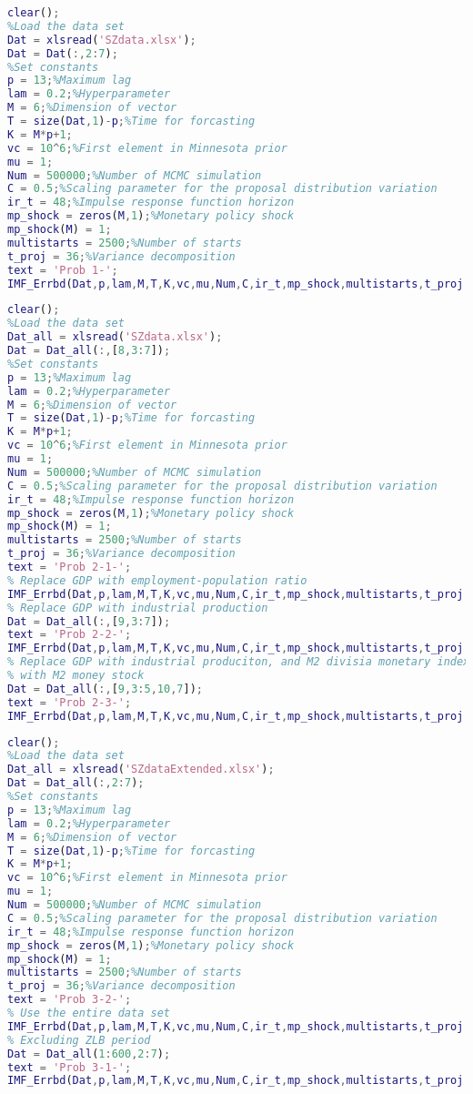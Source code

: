 \documentclass[11pt, oneside]{article}   	%
\begin{document}
\begin{appendices}
\begin{lstlisting}[language=Matlab ,caption={\textit{prob1.m} solves problem 1.}, label={code:prob1}]
clear();
%Load the data set
Dat = xlsread('SZdata.xlsx');
Dat = Dat(:,2:7);
%Set constants
p = 13;%Maximum lag
lam = 0.2;%Hyperparameter
M = 6;%Dimension of vector
T = size(Dat,1)-p;%Time for forcasting
K = M*p+1;
vc = 10^6;%First element in Minnesota prior
mu = 1;
Num = 500000;%Number of MCMC simulation
C = 0.5;%Scaling parameter for the proposal distribution variation
ir_t = 48;%Impulse response function horizon
mp_shock = zeros(M,1);%Monetary policy shock
mp_shock(M) = 1;
multistarts = 2500;%Number of starts
t_proj = 36;%Variance decomposition
text = 'Prob 1-';
IMF_Errbd(Dat,p,lam,M,T,K,vc,mu,Num,C,ir_t,mp_shock,multistarts,t_proj,text);
\end{lstlisting}

\begin{lstlisting}[language=Matlab ,caption={\textit{prob2.m}}, label={code:prob2}]
clear();
%Load the data set
Dat_all = xlsread('SZdata.xlsx');
Dat = Dat_all(:,[8,3:7]);
%Set constants
p = 13;%Maximum lag
lam = 0.2;%Hyperparameter
M = 6;%Dimension of vector
T = size(Dat,1)-p;%Time for forcasting
K = M*p+1;
vc = 10^6;%First element in Minnesota prior
mu = 1;
Num = 500000;%Number of MCMC simulation
C = 0.5;%Scaling parameter for the proposal distribution variation
ir_t = 48;%Impulse response function horizon
mp_shock = zeros(M,1);%Monetary policy shock
mp_shock(M) = 1;
multistarts = 2500;%Number of starts
t_proj = 36;%Variance decomposition
text = 'Prob 2-1-';
% Replace GDP with employment-population ratio
IMF_Errbd(Dat,p,lam,M,T,K,vc,mu,Num,C,ir_t,mp_shock,multistarts,t_proj,text);
% Replace GDP with industrial production
Dat = Dat_all(:,[9,3:7]);
text = 'Prob 2-2-';
IMF_Errbd(Dat,p,lam,M,T,K,vc,mu,Num,C,ir_t,mp_shock,multistarts,t_proj,text);
% Replace GDP with industrial produciton, and M2 divisia monetary index
% with M2 money stock
Dat = Dat_all(:,[9,3:5,10,7]);
text = 'Prob 2-3-';
IMF_Errbd(Dat,p,lam,M,T,K,vc,mu,Num,C,ir_t,mp_shock,multistarts,t_proj,text);
\end{lstlisting}

\begin{lstlisting}[language=Matlab ,caption={\textit{prob3.m}}, label={code:prob3}]
clear();
%Load the data set
Dat_all = xlsread('SZdataExtended.xlsx');
Dat = Dat_all(:,2:7);
%Set constants
p = 13;%Maximum lag
lam = 0.2;%Hyperparameter
M = 6;%Dimension of vector
T = size(Dat,1)-p;%Time for forcasting
K = M*p+1;
vc = 10^6;%First element in Minnesota prior
mu = 1;
Num = 500000;%Number of MCMC simulation
C = 0.5;%Scaling parameter for the proposal distribution variation
ir_t = 48;%Impulse response function horizon
mp_shock = zeros(M,1);%Monetary policy shock
mp_shock(M) = 1;
multistarts = 2500;%Number of starts
t_proj = 36;%Variance decomposition
text = 'Prob 3-2-';
% Use the entire data set
IMF_Errbd(Dat,p,lam,M,T,K,vc,mu,Num,C,ir_t,mp_shock,multistarts,t_proj,text);
% Excluding ZLB period
Dat = Dat_all(1:600,2:7);
text = 'Prob 3-1-';
IMF_Errbd(Dat,p,lam,M,T,K,vc,mu,Num,C,ir_t,mp_shock,multistarts,t_proj,text);
\end{lstlisting}


\end{appendices}
\end{document}
